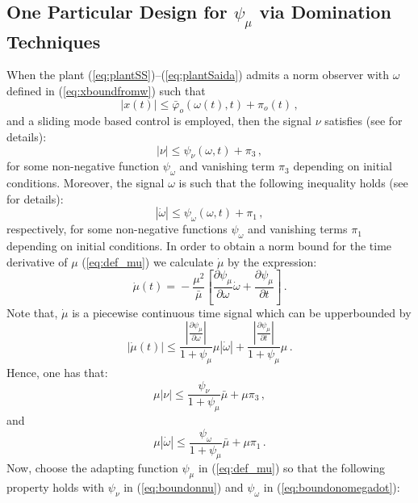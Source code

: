 \documentclass[letterpaper, 10 pt, conference]{ieeeconf}  %
\theoremstyle{plain}
\theoremstyle{definition}
\theoremstyle{remark}
\begin{document}
\subsection{One Particular Design for $\psi_\mu$ via Domination Techniques}

When the plant (\ref{eq:plantSS})--(\ref{eq:plantSaida}) admits a norm observer with $\omega$ defined in (\ref{eq:xboundfromw}) such that 
%
\begin{equation}
|x(t)| \leq \bar{\varphi}_o(\omega(t),t) + \pi_o(t)\,,\label{eq:xboundfromw1}
\end{equation}
%
and a sliding mode based control is employed, then the signal $\nu$ satisfies (see \cite{POH:2011} for details):
%
\begin{equation}
|\nu| \leq \psi_\nu(\omega,t)+\pi_3\,,\label{eq:boundonnu}
\end{equation}
%
for some non-negative function $\psi_\omega$ and vanishing term $\pi_3$ depending on  initial conditions.  Moreover, the signal $\omega$ is such that the following inequality holds (see \cite{POH:2011} for details):
%
\begin{equation}\label{eq:boundonomegadot}
\left|\dot{\omega}\right| \leq \psi_\omega(\omega,t)+\pi_1\,,
\end{equation}
%
respectively, for some non-negative functions $\psi_\omega$  and vanishing terms $\pi_1$ depending on  initial conditions. 
%
In order to obtain a norm bound for the time derivative of $\mu$
(\ref{eq:def_mu}) we calculate $\dot{\mu}$ by the expression:
%
\begin{equation}
\dot{\mu}(t)\!=\!-\frac{\mu^2}{\bar{\mu}} \left[\frac{\partial
\psi_\mu}{\partial \omega} \dot{\omega}+\frac{\partial
\psi_\mu}{\partial t}\right]\,. \label{eq:def_mudot2}
\end{equation}
%
Note that, $\dot{\mu}$ is a piecewise continuous time signal which
can be upperbounded by
%
\begin{equation}
|\dot{\mu}(t)|\!\leq\!\frac{\left|\frac{\partial
\psi_\mu}{\partial \omega}\right|}{1+\psi_\mu} \mu
|\dot{\omega}|+\frac{\left|\frac{\partial \psi_\mu}{\partial
t}\right|}{1+\psi_\mu}\mu\,. \label{eq:mudotbound}
\end{equation}
%
Hence, one has that:
%
\begin{equation}
\mu|\nu| \leq
\frac{\psi_\nu}{1+\psi_\mu}\bar{\mu}+\mu\pi_3\,,\label{eq:boundonmunu}
\end{equation}
%
and
%
\begin{equation}
\mu|\dot{\omega}| \leq
\frac{\psi_\omega}{1+\psi_\mu}\bar{\mu}+\mu\pi_1\,.\label{eq:boundonmudotomega}
\end{equation}
%
Now, choose the adapting function $\psi_\mu$ in
(\ref{eq:def_mu}) so that the following property holds with
$\psi_\nu$ in (\ref{eq:boundonnu}) and $\psi_\omega$ in
(\ref{eq:boundonomegadot}):
\end{document}
